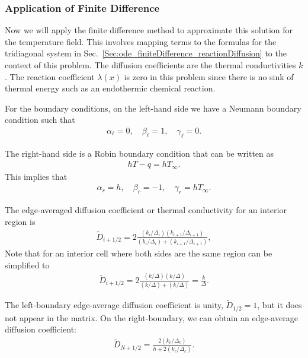 \subsubsection{Application of Finite Difference}

Now we will apply the finite difference method to approximate this solution for the temperature field. This involves mapping terms to the formulas for the tridiagonal system in Sec.~\ref{Sec:ode_finiteDifference_reactionDiffusion} to the context of this problem. The diffusion coefficients are the thermal conductivities $k$. The reaction coefficient $\lambda(x)$ is zero in this problem since there is no sink of thermal energy such as an endothermic chemical reaction. 

For the boundary conditions, on the left-hand side we have a Neumann boundary condition such that
\begin{align}
  \alpha_\ell = 0, \quad \beta_\ell = 1, \quad \gamma_\ell = 0. \nonumber
\end{align}

The right-hand side is a Robin boundary condition that can be written as
\begin{align}
  hT - q = h T_\infty . \nonumber
\end{align}
This implies that
\begin{align}
  \alpha_r = h, \quad \beta_r = -1, \quad \gamma_r = h T_\infty . \nonumber
\end{align}

The edge-averaged diffusion coefficient or thermal conductivity for an interior region is
\begin{align}
  \widetilde{D}_{i+1/2} = 2 \frac{ (k_i/\Delta_i) (k_{i+1}/\Delta_{i+1}) }{ (k_i/\Delta_i) + (k_{i+1}/\Delta_{i+1}) } , 
\end{align}
Note that for an interior cell where both sides are the same region can be simplified to
\begin{align}
  \widetilde{D}_{i+1/2} = 2 \frac{ (k/\Delta) (k/\Delta) }{ (k/\Delta) + (k/\Delta) } = \frac{k}{\Delta} .
\end{align} 

The left-boundary edge-average diffusion coefficient is unity, $\widetilde{D}_{1/2} = 1$, but it does not appear in the matrix. On the right-boundary, we can obtain an edge-average diffusion coefficient:
\begin{align}
  \widetilde{D}_{N+1/2} = \frac{ 2 (k_c / \Delta_c ) }{ h + 2 (k_c / \Delta_c ) } .
\end{align}

